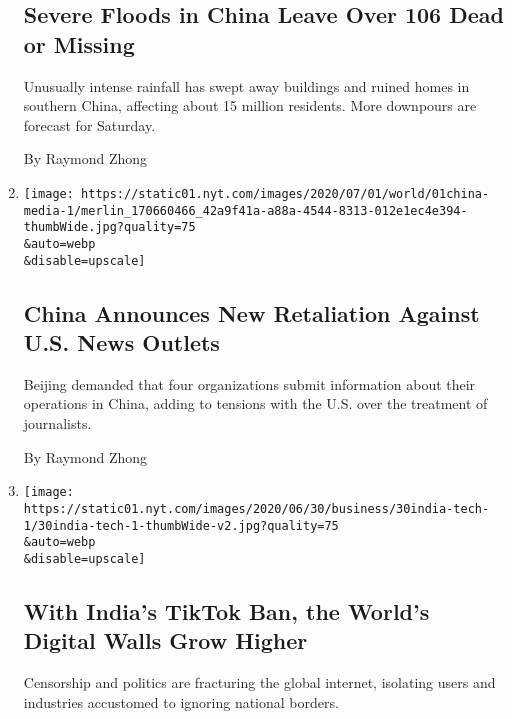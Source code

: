 \begin{enumerate}
  \hypertarget{severe-floods-in-china-leave-over-106-dead-or-missing}{%
  \subsection{Severe Floods in China Leave Over 106 Dead or
  Missing}\label{severe-floods-in-china-leave-over-106-dead-or-missing}}

  Unusually intense rainfall has swept away buildings and ruined homes
  in southern China, affecting about 15 million residents. More
  downpours are forecast for Saturday.

  By Raymond Zhong
\item
  \href{/2020/07/01/business/media/china-journalists-crackdown.html}{}

  \texttt{[image: https://static01.nyt.com/images/2020/07/01/world/01china-media-1/merlin\_170660466\_42a9f41a-a88a-4544-8313-012e1ec4e394-thumbWide.jpg?quality=75\\\&auto=webp\\\&disable=upscale]}

  \hypertarget{china-announces-new-retaliation-against-us-news-outlets}{%
  \subsection{China Announces New Retaliation Against U.S. News
  Outlets}\label{china-announces-new-retaliation-against-us-news-outlets}}

  Beijing demanded that four organizations submit information about
  their operations in China, adding to tensions with the U.S. over the
  treatment of journalists.

  By Raymond Zhong
\item
  \href{/2020/06/30/technology/india-china-tiktok.html}{}

  \texttt{[image: https://static01.nyt.com/images/2020/06/30/business/30india-tech-1/30india-tech-1-thumbWide-v2.jpg?quality=75\\\&auto=webp\\\&disable=upscale]}

  \hypertarget{with-indias-tiktok-ban-the-worlds-digital-walls-grow-higher}{%
  \subsection{With India's TikTok Ban, the World's Digital Walls Grow
  Higher}\label{with-indias-tiktok-ban-the-worlds-digital-walls-grow-higher}}

  Censorship and politics are fracturing the global internet, isolating
  users and industries accustomed to ignoring national borders.


\end{enumerate}
